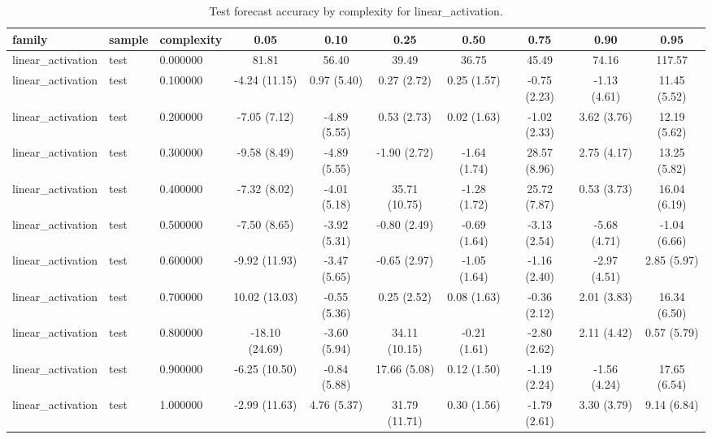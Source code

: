 \begin{table}
\caption{Test forecast accuracy by complexity for linear_activation.}
\label{tab:test_linear_activation}
\begin{tabular}{lllccccccc}
\toprule
family & sample & complexity & 0.05 & 0.10 & 0.25 & 0.50 & 0.75 & 0.90 & 0.95 \\
\midrule
linear_activation & test & 0.000000 & 81.81 & 56.40 & 39.49 & 36.75 & 45.49 & 74.16 & 117.57 \\
linear_activation & test & 0.100000 & -4.24
(11.15) & 0.97
(5.40) & 0.27
(2.72) & 0.25
(1.57) & -0.75
(2.23) & -1.13
(4.61) & 11.45
(5.52) \\
linear_activation & test & 0.200000 & -7.05
(7.12) & -4.89
(5.55) & 0.53
(2.73) & 0.02
(1.63) & -1.02
(2.33) & 3.62
(3.76) & 12.19
(5.62) \\
linear_activation & test & 0.300000 & -9.58
(8.49) & -4.89
(5.55) & -1.90
(2.72) & -1.64
(1.74) & 28.57
(8.96) & 2.75
(4.17) & 13.25
(5.82) \\
linear_activation & test & 0.400000 & -7.32
(8.02) & -4.01
(5.18) & 35.71
(10.75) & -1.28
(1.72) & 25.72
(7.87) & 0.53
(3.73) & 16.04
(6.19) \\
linear_activation & test & 0.500000 & -7.50
(8.65) & -3.92
(5.31) & -0.80
(2.49) & -0.69
(1.64) & -3.13
(2.54) & -5.68
(4.71) & -1.04
(6.66) \\
linear_activation & test & 0.600000 & -9.92
(11.93) & -3.47
(5.65) & -0.65
(2.97) & -1.05
(1.64) & -1.16
(2.40) & -2.97
(4.51) & 2.85
(5.97) \\
linear_activation & test & 0.700000 & 10.02
(13.03) & -0.55
(5.36) & 0.25
(2.52) & 0.08
(1.63) & -0.36
(2.12) & 2.01
(3.83) & 16.34
(6.50) \\
linear_activation & test & 0.800000 & -18.10
(24.69) & -3.60
(5.94) & 34.11
(10.15) & -0.21
(1.61) & -2.80
(2.62) & 2.11
(4.42) & 0.57
(5.79) \\
linear_activation & test & 0.900000 & -6.25
(10.50) & -0.84
(5.88) & 17.66
(5.08) & 0.12
(1.50) & -1.19
(2.24) & -1.56
(4.24) & 17.65
(6.54) \\
linear_activation & test & 1.000000 & -2.99
(11.63) & 4.76
(5.37) & 31.79
(11.71) & 0.30
(1.56) & -1.79
(2.61) & 3.30
(3.79) & 9.14
(6.84) \\
\bottomrule
\end{tabular}
\end{table}
